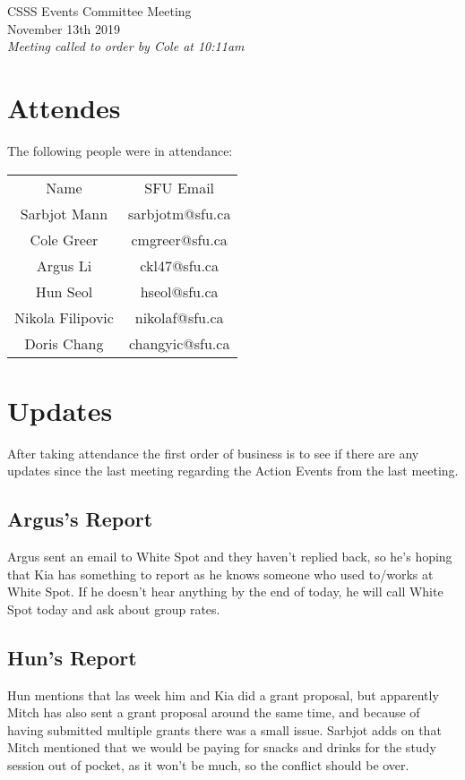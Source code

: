 \documentclass[12pt]{article}
\begin{document}
\begin{center}
CSSS Events Committee Meeting \\
November 13th 2019 \\
\em Meeting called to order by Cole at 10:11am
\end{center}
\tableofcontents
\newpage 
\section{Attendes} \label{sec:Introduction}
The following people were in attendance: 
\begin{table}[h]
\centering
\begin{tabular}{cc}
Name                   & SFU Email             \\
Sarbjot Mann           & sarbjotm@sfu.ca       \\
Cole Greer             & cmgreer@sfu.ca        \\
Argus Li               & ckl47@sfu.ca          \\
Hun Seol               & hseol@sfu.ca          \\
Nikola Filipovic  & nikolaf@sfu.ca  \\
Doris Chang            & changyic@sfu.ca      

\end{tabular}
\end{table}

\section{Updates} \label{sec:Updates}

\noindent After taking attendance the first order of business is to see if there are any updates since the last meeting regarding the Action Events from the last meeting.

\subsection{Argus's Report}
\noindent Argus sent an email to White Spot and they haven't replied back, so he's hoping that Kia has something to report as he knows someone who used to/works at White Spot. If he doesn't hear anything by the end of today, he will call White Spot today and ask about group rates. 


\subsection{Hun's Report}
\noindent Hun mentions that las week him and Kia did a grant proposal, but apparently Mitch has also sent a grant proposal around the same time, and because of having submitted multiple grants there was a small issue. Sarbjot adds on that Mitch mentioned that we would be paying for snacks and drinks for the study session out of pocket, as it won't be much, so the conflict should be over. 
\end{document}
